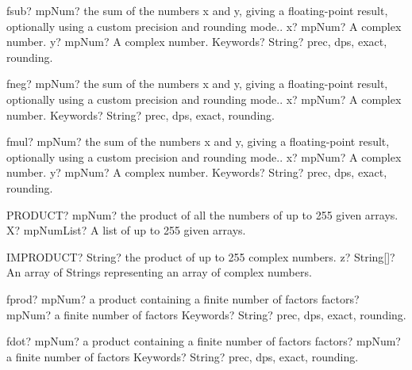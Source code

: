 \documentclass[12pt,a4paper,openany]{book}
\begin{document}
\begin{mpFunctionsExtract}
\mpFunctionThree
{fsub? mpNum? the sum of the numbers x and y, giving a floating-point result, optionally using a custom precision and rounding mode..}
{x? mpNum? A complex number.}
{y? mpNum? A complex number.}
{Keywords? String? prec, dps, exact, rounding.}
\end{mpFunctionsExtract}

\begin{mpFunctionsExtract}
\mpFunctionTwo
{fneg? mpNum? the sum of the numbers x and y, giving a floating-point result, optionally using a custom precision and rounding mode..}
{x? mpNum? A complex number.}
{Keywords? String? prec, dps, exact, rounding.}
\end{mpFunctionsExtract}

\begin{mpFunctionsExtract}
\mpFunctionThree
{fmul? mpNum? the sum of the numbers x and y, giving a floating-point result, optionally using a custom precision and rounding mode..}
{x? mpNum? A complex number.}
{y? mpNum? A complex number.}
{Keywords? String? prec, dps, exact, rounding.}
\end{mpFunctionsExtract}

\begin{mpFunctionsExtract}
\mpWorksheetFunctionOneNotImplemented
{PRODUCT? mpNum? the product of all the numbers of up to 255 given arrays.}
{X? mpNumList? A list of up to 255 given arrays.}
\end{mpFunctionsExtract}

\begin{mpFunctionsExtract}
\mpWorksheetFunctionOneNotImplemented
{IMPRODUCT? String? the product of up to 255 complex numbers.}
{z? String[]? An array of Strings representing an array of complex numbers.}
\end{mpFunctionsExtract}

\begin{mpFunctionsExtract}
\mpFunctionTwo
{fprod? mpNum? a product containing a finite number of factors}
{factors? mpNum? a finite number of factors}
{Keywords? String? prec, dps, exact, rounding.}
\end{mpFunctionsExtract}

\begin{mpFunctionsExtract}
\mpFunctionTwo
{fdot? mpNum? a product containing a finite number of factors}
{factors? mpNum? a finite number of factors}
{Keywords? String? prec, dps, exact, rounding.}
\end{mpFunctionsExtract}
\end{document}
